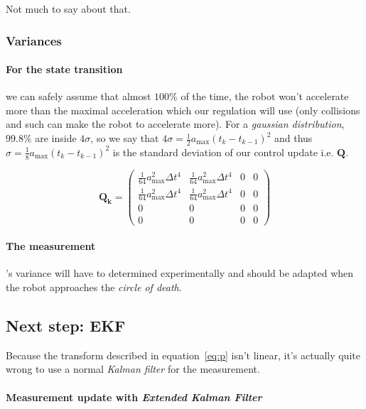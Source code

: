 \documentclass[a4paper, 12pt]{paper}
\begin{document}
Not much to say about that.

\subsubsection{Variances}

\paragraph{For the state transition}
\label{pg:variance_state_trans}
we can safely assume that almost $100\%$ of the time, the robot
won't accelerate more than the maximal acceleration which our regulation will
use (only collisions and such can make the robot to accelerate more).
For a \emph{gaussian distribution}, $99.8\%$ are inside $4\sigma$, so we say
that $4\sigma = \frac{1}{2} a_{\max} {\left( t_k - t_{k-1} \right)}^2 $ and thus 
$\sigma = \frac{1}{8} a_{\max} {\left( t_k - t_{k-1} \right)}^2 $ is the standard
deviation of our control update i.e. $\mathbf{Q}$.

\begin{equation}
    \mathbf{Q_k} = \left( \begin{array}{cccc}
        \frac{1}{64} a_{\max}^2 \Delta t^4 & \frac{1}{64} a_{\max}^2 \Delta t^4 & 0 & 0\\
        \frac{1}{64} a_{\max}^2 \Delta t^4 & \frac{1}{64} a_{\max}^2 \Delta t^4 & 0 & 0\\
        0 & 0 & 0 & 0 \\
        0 & 0 & 0 & 0 \end{array} \right)
\label{eq:q}
\end{equation}

\paragraph{The measurement}'s variance will have to determined experimentally
and should be adapted when the robot approaches the \emph{circle of death}.


\subsection{Next step: EKF}

Because the transform described in equation~\ref{eq:p} isn't linear, it's
actually quite wrong to use a normal \emph{Kalman filter} for the measurement.

\paragraph{Measurement update with \emph{Extended Kalman Filter}}
\end{document}
